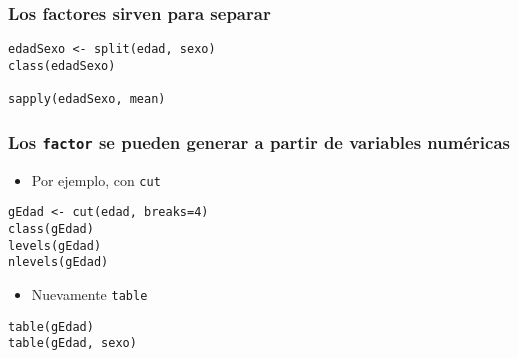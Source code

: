 \documentclass{beamer}
\begin{document}
\begin{frame}[fragile]
\frametitle{Los factores sirven para separar}
\label{sec-4-1-4}


\lstset{language=R}
\begin{lstlisting}
edadSexo <- split(edad, sexo)
class(edadSexo)

sapply(edadSexo, mean)
\end{lstlisting}
\end{frame}
\begin{frame}[fragile]
\frametitle{Los \texttt{factor} se pueden generar a partir de variables numéricas}
\label{sec-4-1-5}

\begin{itemize}
\item Por ejemplo, con \texttt{cut}
\end{itemize}

\lstset{language=R}
\begin{lstlisting}
gEdad <- cut(edad, breaks=4)
class(gEdad)
levels(gEdad)
nlevels(gEdad)
\end{lstlisting}

\begin{itemize}
\item Nuevamente \texttt{table}
\end{itemize}

\lstset{language=R}
\begin{lstlisting}
table(gEdad)
table(gEdad, sexo)
\end{lstlisting}
\end{frame}
\end{document}
